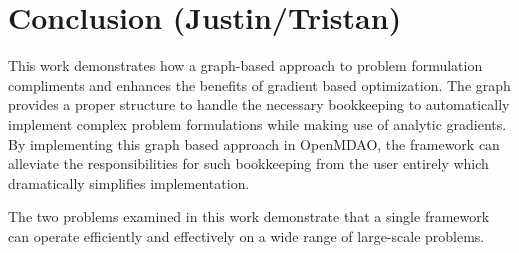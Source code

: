 \documentclass[]{aiaa-tc} %
\begin{document}
  \section{Conclusion (Justin/Tristan)}

      This work demonstrates how a graph-based approach to problem formulation compliments and enhances the benefits of gradient based
      optimization. The graph provides a proper structure to handle the necessary bookkeeping to automatically implement complex
      problem formulations while making use of analytic gradients. By implementing this graph based approach in OpenMDAO, the framework
      can alleviate the responsibilities for such bookkeeping from the user entirely which dramatically simplifies implementation.

      The two problems examined in this work demonstrate that a single framework can operate efficiently and effectively on a wide range of large-scale problems.

  
\end{document}
